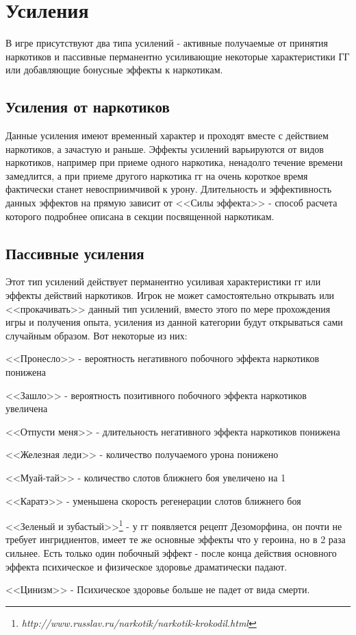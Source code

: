 \documentclass[11pt]{report}
\newenvironment{itemize*}%
  {\begin{itemize}%
    \setlength{\itemsep}{2pt}%
    \setlength{\parskip}{0.75pt}}%
  {\end{itemize}}
\begin{document}
\section{Усиления}
В игре присутствуют два типа усилений - активные получаемые от принятия наркотиков и пассивные перманентно усиливающие некоторые характеристики ГГ или добавляющие бонусные эффекты к наркотикам. 
\subsection{Усиления от наркотиков}
Данные усиления имеют временный характер и проходят вместе с действием наркотиков, а зачастую и раньше. Эффекты усилений варьируются от видов наркотиков, например при приеме одного наркотика, ненадолго течение времени замедлится, а при приеме другого наркотика гг на очень короткое время фактически станет невосприимчивой к урону. Длительность и эффективность данных эффектов на прямую зависит от <<Силы эффекта>> - способ расчета которого подробнее описана в секции посвященной наркотикам.
\subsection{Пассивные усиления}
Этот тип усилений действует перманентно усиливая характеристики гг или эффекты действий наркотиков. Игрок не может самостоятельно открывать или <<прокачивать>> данный тип усилений, вместо этого по мере прохождения игры и получения опыта, усиления из данной категории будут открываться сами случайным образом. Вот некоторые из них: \begin{itemize*}
\item <<Пронесло>> - вероятность негативного побочного эффекта наркотиков понижена
\item <<Зашло>> - вероятность позитивного побочного эффекта наркотиков увеличена
\item <<Отпусти меня>> - длительность негативного эффекта наркотиков понижена
\item <<Железная леди>> - количество получаемого урона понижено
\item <<Муай-тай>> - количество слотов ближнего боя увеличено на 1
\item <<Каратэ>> - уменьшена скорость регенерации слотов ближнего боя
\item <<Зеленый и зубастый>>\footnote{\emph{http://www.russlav.ru/narkotik/narkotik-krokodil.html}} - у гг появляется рецепт Дезоморфина, он почти не требует ингридиентов, имеет те же основные эффекты что у героина, но в 2 раза сильнее. Есть только один побочный эффект - после конца действия основного эффекта психическое и физическое здоровье драматически падают. 
\item <<Цинизм>> - Психическое здоровье больше не падет от вида смерти.\\
\end{itemize*}
\end{document}
